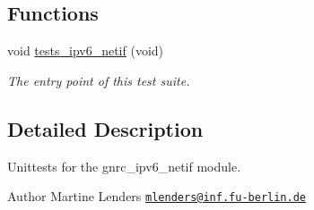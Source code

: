 \subsection*{Functions}
\begin{DoxyCompactItemize}
\item 
void \hyperlink{group__unittests_gaee22d83f1a9d3716168640ccd429c918}{tests\+\_\+ipv6\+\_\+netif} (void)
\begin{DoxyCompactList}\small\item\em The entry point of this test suite. \end{DoxyCompactList}\end{DoxyCompactItemize}


\subsection{Detailed Description}
Unittests for the {\ttfamily gnrc\+\_\+ipv6\+\_\+netif} module. 

\begin{DoxyAuthor}{Author}
Martine Lenders \href{mailto:mlenders@inf.fu-berlin.de}{\tt mlenders@inf.\+fu-\/berlin.\+de} 
\end{DoxyAuthor}
